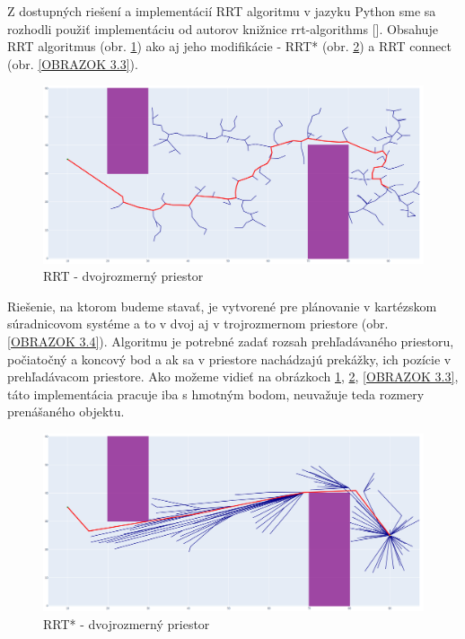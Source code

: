 Z dostupných riešení a implementácií RRT algoritmu v jazyku Python sme sa rozhodli použiť implementáciu od autorov knižnice rrt-algorithms []. Obsahuje RRT algoritmus (obr. \ref{OBRAZOK 3.1}) ako aj jeho modifikácie - RRT* (obr. \ref{OBRAZOK 3.2}) a RRT connect (obr. \ref{OBRAZOK 3.3}).

\begin{figure}[]
	\centering
	\includegraphics[width=140mm]{img/RRT-2D.png}
	\caption{RRT - dvojrozmerný priestor} \label{OBRAZOK 3.1} 
\end{figure} 
Riešenie, na ktorom budeme stavať, je vytvorené pre plánovanie v kartézskom súradnicovom systéme a to v dvoj aj v trojrozmernom priestore (obr. \ref{OBRAZOK 3.4}). Algoritmu je potrebné zadať rozsah prehľadávaného priestoru, počiatočný a koncový bod a ak sa v priestore nachádzajú prekážky, ich pozície v prehľadávacom priestore. Ako možeme vidieť na obrázkoch \ref{OBRAZOK 3.1}, \ref{OBRAZOK 3.2}, \ref{OBRAZOK 3.3}, táto implementácia pracuje iba s hmotným bodom, neuvažuje teda rozmery prenášaného objektu.
\begin{figure}[]
	\centering
	\includegraphics[width=140mm]{img/RRTstar-2D.png}
	\caption{RRT* - dvojrozmerný priestor} \label{OBRAZOK 3.2} 
\end{figure} 

